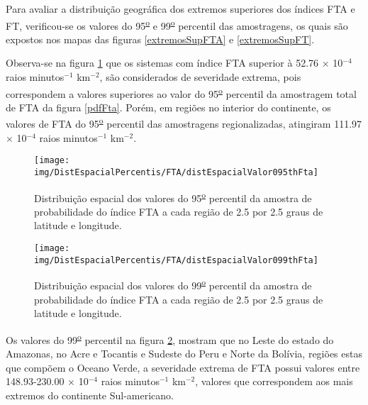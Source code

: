 Para avaliar a distribuição geográfica dos extremos superiores dos índices FTA e FT, verificou-se os valores do 95\textsuperscript{\underline{o}} e 99\textsuperscript{\underline{o}} percentil das amostragens, os quais são expostos nos mapas das figuras \ref{extremosSupFTA} e \ref{extremosSupFT}.


Observa-se na figura \ref{95oFta} que os sistemas com índice FTA  superior à 52.76 $\times$ 10$^{-4}$ raios minutos$^{-1}$
km$^{-2}$, são considerados de severidade extrema, pois correspondem a valores superiores ao valor do 95\textsuperscript{\underline{o}} percentil da amostragem total de FTA da figura \ref{pdfFta}. Porém, em regiões no interior do continente, os valores de FTA do 95\textsuperscript{\underline{o}} percentil das amostragens regionalizadas, atingiram  111.97 $\times$ 10$^{-4}$ raios minutos$^{-1}$ km$^{-2}$.

\begin{figure}[!ht]
\centering
{\texttt{[image: img/DistEspacialPercentis/FTA/distEspacialValor095thFta]}} 
\caption{Distribuição espacial dos valores do 95\textsuperscript{\underline{o}} percentil da amostra de probabilidade do índice FTA a cada região de 2.5 por 2.5 graus de latitude e longitude.}
\label{95oFta}
\end{figure} 
  
\begin{figure}[!ht]
\centering  
{\texttt{[image: img/DistEspacialPercentis/FTA/distEspacialValor099thFta]}}
\caption{Distribuição espacial dos valores do  99\textsuperscript{\underline{o}} percentil da amostra de probabilidade do índice FTA a cada região de 2.5 por 2.5 graus de latitude e longitude.}
\label{99oFta}
\end{figure} 


Os valores do 99\textsuperscript{\underline{o}} percentil na figura \ref{99oFta}, mostram que no Leste do estado do Amazonas, no Acre e Tocantis e Sudeste do Peru e Norte da Bolívia, regiões estas que compõem o Oceano Verde, a severidade extrema de FTA possui valores entre 148.93-230.00  $\times$ 10$^{-4}$ raios minutos$^{-1}$ km$^{-2}$,  valores que correspondem aos mais extremos do continente Sul-americano. 

